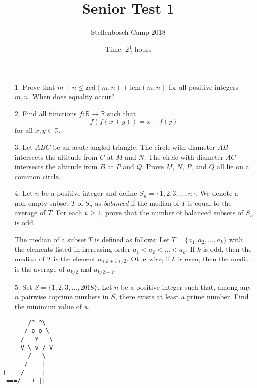 \documentclass[a4paper, 12pt]{article}
\title{Senior Test 1}
\author{Stellenbosch Camp 2018}
\date{Time: $2 \frac{1}{2}$ hours}
\begin{document}
 \maketitle

\begin{enumerate}


\item[1.] Prove that $m + n \leq \textrm{gcd}(m, n) + \textrm{lcm}(m, n)$ for all positive integers $m, n$. When does equality occur?

\item[2.] Find all functions $f : \mathbb{R} \to \mathbb{R}$ such that
$$ f(f(x+y)) = x + f(y) $$
for all $x, y \in \mathbb{R}$.

\item[3.] Let $ABC$ be an acute angled triangle. The circle with diameter $AB$ intersects the altitude from $C$ at $M$ and $N$. The circle with diameter $AC$ intersects the altitude from $B$ at $P$ and $Q$. Prove $M$, $N$, $P$, and $Q$ all lie on a common circle.




\item[4.] Let $n$ be a positive integer and define $S_n = \{1, 2, 3, \dots, n\}$. We denote a non-empty subset $T$ of $S_n$ as \textit{balanced} if the median of $T$ is equal to the average of $T$. For each $n \geq 1$, prove that the number of balanced subsets of $S_n$ is odd. 

The median of a subset $T$ is defined as follows: Let $T = \{a_1, a_2, \dots, a_k\}$ with the elements listed in increasing order $a_1 < a_2 < \dots < a_k$. If $k$ is odd, then the median of $T$ is the element $a_{(k+1)/2}$. Otherwise, if $k$ is even, then the median is the average of $a_{k/2}$ and $a_{k/2 + 1}$.

\item[5.] Set $S = \{1, 2, 3, ..., 2018\}$. Let $n$ be a positive integer such that, among any $n$ pairwise coprime numbers in $S$, there exists at least a prime number. Find the minimum value of $n$.


\end{enumerate}

\vfill

\centering
\begin{BVerbatim}
       /^-^\
      / o o \
     /   Y   \
     V \ v / V
       / - \
      /    |
(    /     |
 ===/___) ||
\end{BVerbatim}

\vspace{10mm}
\end{document}
